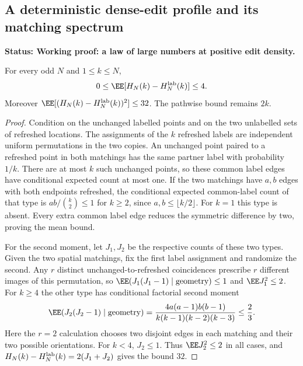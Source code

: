 \documentclass[11pt,letterpaper]{article}
\newcommand{\status}[1]{\textbf{Status: #1.}}
\begin{document}
\subsection{A deterministic dense-edit profile and its matching spectrum}
\label{sec:dense-history}

\status{Working proof: a law of large numbers at positive edit density}

\begin{lemma}
\label{lem:history-label-correction}
For every odd $N$ and $1\le k\le N$,
\[
 0\le\EE[H_N(k)-H_N^{\rm lab}(k)]\le4.
\]
Moreover $\EE[(H_N(k)-H_N^{\rm lab}(k))^2]\le32$.
The pathwise bound remains $2k$.
\end{lemma}
\begin{proof}
Condition on the unchanged labelled points and on the two unlabelled
sets of refreshed locations. The assignments of the $k$ refreshed
labels are independent uniform permutations in the two copies.
An unchanged point paired to a refreshed point in both matchings
has the same partner label with probability $1/k$.
There are at most $k$ such unchanged points, so these common label
edges have conditional expected count at most one.
If the two matchings have $a,b$ edges with both endpoints refreshed,
the conditional expected common-label count of that type is
$ab/\binom{k}{2}\le1$ for $k\ge2$, since $a,b\le\lfloor k/2\rfloor$.
For $k=1$ this type is absent. Every extra common label edge reduces
the symmetric difference by two, proving the mean bound.

For the second moment, let $J_1,J_2$ be the respective counts of
these two types. Given the two spatial matchings, fix the first
label assignment and randomize the second. Any $r$ distinct
unchanged-to-refreshed coincidences prescribe $r$ different
images of this permutation, so
$\EE(J_1(J_1-1)\mid\text{geometry})\le1$ and $\EE J_1^2\le2$.
For $k\ge4$ the other type has conditional factorial second moment
\[
 \EE(J_2(J_2-1)\mid\text{geometry})
    =\frac{4a(a-1)b(b-1)}{k(k-1)(k-2)(k-3)}
    \le\frac23.
\]
Here the $r=2$ calculation chooses two disjoint edges in each
matching and their two possible orientations. For $k<4$,
$J_2\le1$. Thus $\EE J_2^2\le2$ in all cases, and
$H_N(k)-H_N^{\rm lab}(k)=2(J_1+J_2)$ gives the bound $32$.
\end{proof}
\end{document}
